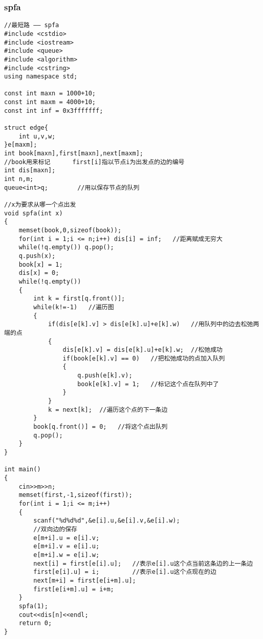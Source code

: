 \documentclass[twoside]{article}
\begin{document}
\subsubsection{spfa}
\begin{lstlisting}
//最短路 —— spfa
#include <cstdio>
#include <iostream>
#include <queue>
#include <algorithm>
#include <cstring>
using namespace std;

const int maxn = 1000+10;
const int maxm = 4000+10;
const int inf = 0x3fffffff;

struct edge{
	int u,v,w;
}e[maxm];
int book[maxn],first[maxn],next[maxm];	
//book用来标记		first[i]指以节点i为出发点的边的编号 
int dis[maxn];
int n,m;
queue<int>q;		//用以保存节点的队列 

//x为要求从哪一个点出发 
void spfa(int x)
{
	memset(book,0,sizeof(book));
	for(int i = 1;i <= n;i++) dis[i] = inf;   //距离赋成无穷大 
	while(!q.empty()) q.pop();
	q.push(x);   
	book[x] = 1;  
	dis[x] = 0;
	while(!q.empty())
	{
		int k = first[q.front()];
		while(k!=-1)   //遍历图 
		{
			if(dis[e[k].v] > dis[e[k].u]+e[k].w)   //用队列中的边去松弛两端的点 
			{
				dis[e[k].v] = dis[e[k].u]+e[k].w;  //松弛成功 
				if(book[e[k].v] == 0)   //把松弛成功的点加入队列 
				{
					q.push(e[k].v);
					book[e[k].v] = 1;   //标记这个点在队列中了 
				}
			}
			k = next[k];  //遍历这个点的下一条边 
		}
		book[q.front()] = 0;   //将这个点出队列 
		q.pop();
	}
}

int main()
{
	cin>>m>>n;
	memset(first,-1,sizeof(first));
	for(int i = 1;i <= m;i++)
	{
		scanf("%d%d%d",&e[i].u,&e[i].v,&e[i].w);
		//双向边的保存 
		e[m+i].u = e[i].v;
		e[m+i].v = e[i].u;
		e[m+i].w = e[i].w;
		next[i] = first[e[i].u];   //表示e[i].u这个点当前这条边的上一条边 
		first[e[i].u] = i;         //表示e[i].u这个点现在的边  
		next[m+i] = first[e[i+m].u];
		first[e[i+m].u] = i+m;
	}
	spfa(1);
	cout<<dis[n]<<endl;
	return 0;
}
\end{lstlisting}
\end{document}
